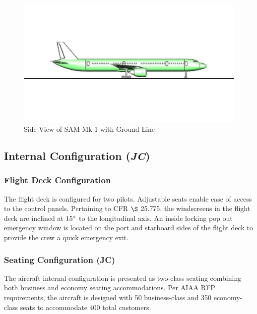 \begin{figure}[!h]
    \centering
    \includegraphics[width=1.0\textwidth]{Photos/Ground_Line.pdf}
    \caption{Side View of SAM Mk 1 with Ground Line}
    \label{grndline}
 \end{figure}

\subsection{Internal Configuration (\textit{JC})}
\label{section: internal config}
\subsubsection{Flight Deck Configuration}
The flight deck is configured for two pilots.  Adjustable seats enable ease of access to the control panels.  Pertaining to CFR $\S$ 25.775, the windscreens in the flight deck are inclined at $15\degree$ to the longitudinal axis.  An inside locking pop out emergency window is located on the port and starboard sides of the flight deck to provide the crew a quick emergency exit.

\clearpage 
\subsubsection{Seating Configuration (JC)}
The aircraft internal configuration is presented as two-class seating combining both business and economy seating accommodations.  Per AIAA RFP \cite{RFP} requirements, the aircraft is designed with 50 business-class and 350 economy-class seats to accommodate 400 total customers.  

